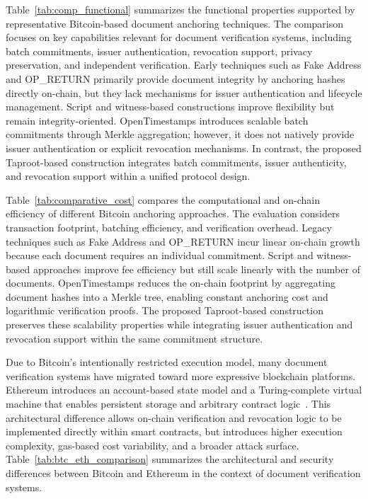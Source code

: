 \documentclass{IEEEoj}
\begin{document}
Table~\ref{tab:comp_functional} summarizes the functional properties supported by representative Bitcoin-based document anchoring techniques. 
The comparison focuses on key capabilities relevant for document verification systems, including batch commitments, issuer authentication, revocation support, privacy preservation, and independent verification. 
Early techniques such as Fake Address and OP\_RETURN primarily provide document integrity by anchoring hashes directly on-chain, but they lack mechanisms for issuer authentication and lifecycle management. 
Script and witness-based constructions improve flexibility but remain integrity-oriented. 
OpenTimestamps introduces scalable batch commitments through Merkle aggregation; however, it does not natively provide issuer authentication or explicit revocation mechanisms. 
In contrast, the proposed Taproot-based construction integrates batch commitments, issuer authenticity, and revocation support within a unified protocol design.



Table~\ref{tab:comparative_cost} compares the computational and on-chain efficiency of different Bitcoin anchoring approaches. 
The evaluation considers transaction footprint, batching efficiency, and verification overhead. 
Legacy techniques such as Fake Address and OP\_RETURN incur linear on-chain growth because each document requires an individual commitment. 
Script and witness-based approaches improve fee efficiency but still scale linearly with the number of documents. 
OpenTimestamps reduces the on-chain footprint by aggregating document hashes into a Merkle tree, enabling constant anchoring cost and logarithmic verification proofs. 
The proposed Taproot-based construction preserves these scalability properties while integrating issuer authentication and revocation support within the same commitment structure.



Due to Bitcoin’s intentionally restricted execution model, many document verification systems have migrated toward more expressive blockchain platforms. Ethereum introduces an account-based state model and a Turing-complete virtual machine that enables persistent storage and arbitrary contract logic~\cite{buterin2014ethereum}. This architectural difference allows on-chain verification and revocation logic to be implemented directly within smart contracts, but introduces higher execution complexity, gas-based cost variability, and a broader attack surface. Table~\ref{tab:btc_eth_comparison} summarizes the architectural and security differences between Bitcoin and Ethereum in the context of document verification systems.
\end{document}
